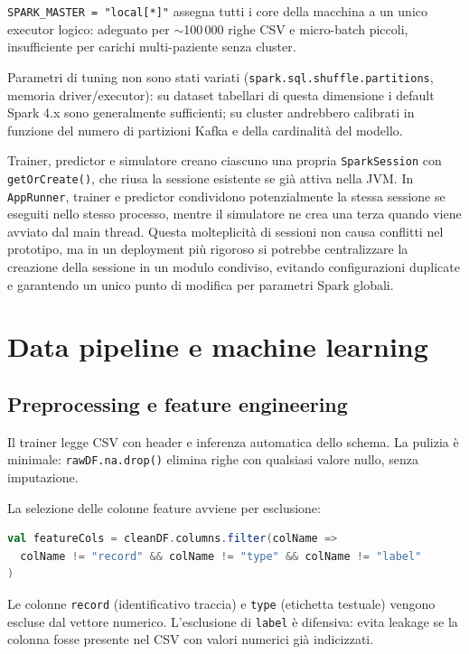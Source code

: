 \texttt{SPARK\_MASTER = "local[*]"} assegna tutti i core della macchina a un unico executor logico: adeguato per $\sim$100\,000 righe CSV e micro-batch piccoli, insufficiente per carichi multi-paziente senza cluster.

Parametri di tuning non sono stati variati (\texttt{spark.sql.shuffle.partitions}, memoria driver/executor): su dataset tabellari di questa dimensione i default Spark 4.x sono generalmente sufficienti; su cluster andrebbero calibrati in funzione del numero di partizioni Kafka e della cardinalità del modello.

Trainer, predictor e simulatore creano ciascuno una propria \texttt{SparkSession} con \texttt{getOrCreate()}, che riusa la sessione esistente se già attiva nella JVM.
In \texttt{AppRunner}, trainer e predictor condividono potenzialmente la stessa sessione se eseguiti nello stesso processo, mentre il simulatore ne crea una terza quando viene avviato dal main thread.
Questa molteplicità di sessioni non causa conflitti nel prototipo, ma in un deployment più rigoroso si potrebbe centralizzare la creazione della sessione in un modulo condiviso, evitando configurazioni duplicate e garantendo un unico punto di modifica per parametri Spark globali.

\section{Data pipeline e machine learning}\label{sec:data-pipeline-ml}

\subsection{Preprocessing e feature engineering}\label{subsec:preprocessing-fe}

Il trainer legge CSV con header e inferenza automatica dello schema.
La pulizia è minimale: \texttt{rawDF.na.drop()} elimina righe con qualsiasi valore nullo, senza imputazione.

La selezione delle colonne feature avviene per esclusione:

\begin{lstlisting}[language=Scala,caption={Selezione colonne feature in \texttt{EcgModelTrainer}.},label={lst:feature-cols}]
val featureCols = cleanDF.columns.filter(colName =>
  colName != "record" && colName != "type" && colName != "label"
)
\end{lstlisting}

Le colonne \texttt{record} (identificativo traccia) e \texttt{type} (etichetta testuale) vengono escluse dal vettore numerico.
L'esclusione di \texttt{label} è difensiva: evita leakage se la colonna fosse presente nel CSV con valori numerici già indicizzati.

